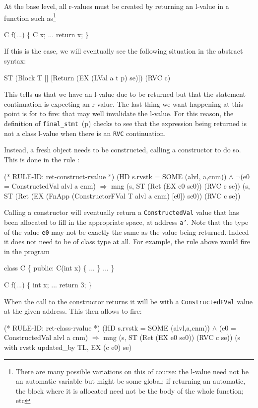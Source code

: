 \documentclass[11pt]{article}
\begin{document}
At the base level, all r-values must be created by returning an
l-value in a function such as\footnote{There are many possible
  variations on this of course: the l-value need not be an automatic
  variable but might be some global; if returning an automatic, the
  block where it is allocated need not be the body of the whole
  function; etc}
\begin{stdrule}
   C f(...)
   \{
     C x;
     ...
     return x;
   \}
\end{stdrule}
If this is the case, we will eventually see the following situation in
the abstract syntax:
\begin{stdrule}
   ST (Block T [] [Return (EX (LVal a t p) se)]) (RVC c)
\end{stdrule}
This tells us that we have an l-value due to be returned but that the
statement continuation is expecting an r-value.  The last thing we
want happening at this point is for
 to fire: that may well
invalidate the l-value.  For this reason, the definition of
\texttt{final_stmt}~(p\pageref{def:final-stmt}) checks to see that the
expression being returned is not a class l-value when there is an
\texttt{RVC} continuation.

Instead, a fresh object needs to be constructed, calling a constructor
to do so.  This is done in the rule
:%
\begin{stdrule}
(* RULE-ID: ret-construct-rvalue *)
     (HD s.rvstk = SOME (alvl, a,cnm)) \(\land\)
     \(\neg\)(e0 = ConstructedVal alvl a cnm)
   \(\Rightarrow\)
     mng (s, ST (Ret (EX e0 se0)) (RVC c se))
         (s, ST (Ret (EX (FnApp (ConstructorFVal T alvl a cnm)
                                [e0])
                         se0))
                (RVC c se))
\end{stdrule}
Calling a constructor will eventually return a \texttt{ConstructedVal} value%
%
that has been allocated to fill in the appropriate space, at address
\texttt{a'}.  Note that the type of the value \texttt{e0} may not be
exactly the same as the value being returned.  Indeed it does not need
to be of class type at all.  For example, the rule above would fire in
the program
\begin{stdrule}
   class C \{
   public:
     C(int x) \{ ... \}
     ...
   \}

   C f(...) \{ int x; ... return 3; \}
\end{stdrule}
When the call to the constructor returns it will be with a
\texttt{ConstructedFVal} value at the given address.  This then allows
 to fire: %
%
\begin{stdrule}
(* RULE-ID: ret-class-rvalue *)
     (HD s.rvstk = SOME (alvl,a,cnm)) \(\land\)
     (e0 = ConstructedVal alvl a cnm)
   \(\Rightarrow\)
     mng (s, ST (Ret (EX e0 se0)) (RVC c se))
         (s with rvstk updated_by TL, EX (c e0) se)
\end{stdrule}
\end{document}

